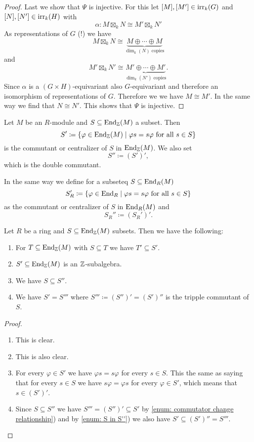 \begin{proof}
 Last we show that $\Psi$ is injective. For this let $[M], [M'] \in \operatorname{irr}_k(G)$ and $[N], [N'] \in \operatorname{irr}_k(H)$ with
 \[
  \alpha \colon M \boxtimes_k N \cong M' \boxtimes_k N'
 \]
 As representations of $G$ (!) we have
 \[
  M \boxtimes_k N \cong \underbrace{M \oplus \dotsb \oplus M}_{\dim_k(N) \text{ copies}}
 \]
 and
 \[
  M' \boxtimes_k N' \cong \underbrace{M' \oplus \dotsb \oplus M'}_{\dim_k(N') \text{ copies}}.
 \]
 Since $\alpha$ is a $(G \times H)$-equivariant also $G$-equivariant and therefore an isomorphism of representations of $G$. Therefore we we have $M \cong M'$. In the same way we find that $N \cong N'$. This shows that $\Psi$ is injective.
\end{proof}

\begin{defi}
 Let $M$ be an $R$-module and $S \subseteq \operatorname{End}_{\mathbb{Z}}(M)$ a subset. Then
 \[
  S' \coloneqq \{\varphi \in \operatorname{End}_{\mathbb{Z}}(M) \mid \varphi s = s \varphi \text{ for all } s \in S\}
 \]
 is the commutant or centralizer of $S$ in $\operatorname{End}_{\mathbb{Z}}(M)$. We also set
 \[
  S'' \coloneqq (S')',
 \]
 which is the double commutant.
 
 In the same way we define for a subseteq $S \subseteq \operatorname{End}_R(M)$
 \[
  S_R' \coloneqq \{\varphi \in \operatorname{End}_R \mid \varphi s = s \varphi \text{ for all } s \in S\}
 \]
 as the commutant or centralizer of $S$ in $\operatorname{End}_R(M)$ and
 \[
  S_R'' \coloneqq (S_R')'.
 \]
\end{defi}


\begin{lem}
 Let $R$ be a ring and $S \subseteq \operatorname{End}_{\mathbb{Z}}(M)$ subsets. Then we have the following:
 \begin{enumerate}[label=\emph{\alph*})]
  \item\label{enum: commutator change relationship}
  For $T \subseteq \operatorname{End}_{\mathbb{Z}}(M)$ with $S \subseteq T$ we have $T' \subseteq S'$.
  \item
  $S' \subseteq \operatorname{End}_{\mathbb{Z}}(M)$ is an $\mathbb{Z}$-subalgebra.
  \item
  We have $S \subseteq S''$. \label{enum: S in S''}
  \item
  We have $S' = S'''$ where $S''' \coloneqq (S'')' = (S')''$ is the tripple commutant of $S$.
 \end{enumerate}
\end{lem}
\begin{proof}
 \begin{enumerate}[label=\emph{\alph*})]
  \item
  This is clear.
  \item
  This is also clear.
  \item
  For every $\varphi \in S'$ we have $\varphi s = s \varphi$ for every $s \in S$. This the same as saying that for every $s \in S$ we have $s \varphi = \varphi s$ for every $\varphi \in S'$, which means that $s \in (S')'$.
  \item
  Since $S \subseteq S''$ we have $S''' = (S'')' \subseteq S'$ by \ref{enum: commutator change relationship}) and by \ref{enum: S in S''}) we also have $S' \subseteq (S')'' = S'''$.
  \qedhere
 \end{enumerate}
\end{proof}


